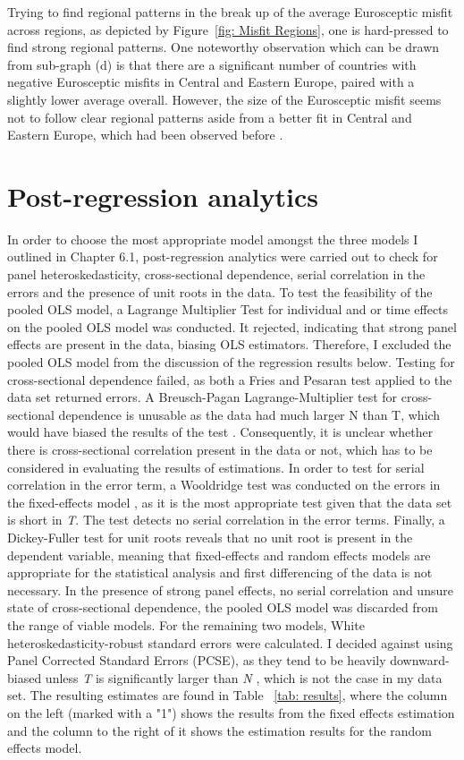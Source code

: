 Trying to find regional patterns in the break up of the average Eurosceptic misfit across regions, as depicted by Figure~\ref{fig: Misfit Regions}, one is hard-pressed to find strong regional patterns. One noteworthy observation which can be drawn from sub-graph (d) is that there are a significant number of countries with negative Eurosceptic misfits in Central and Eastern Europe, paired with a slightly lower average overall. However, the size of the Eurosceptic misfit seems not to follow clear regional patterns aside from a better fit in Central and Eastern Europe, which had been observed before \cite{Taggart2002}.


\section{Post-regression analytics}
In order to choose the most appropriate model amongst the three models I outlined in Chapter 6.1, post-regression analytics were carried out to check for panel heteroskedasticity, cross-sectional dependence, serial correlation in the errors and the presence of unit roots in the data. 
To test the feasibility of the pooled OLS model, a Lagrange Multiplier Test for individual and or time effects on the pooled OLS model was conducted. It rejected, indicating that strong panel effects are present in the data, biasing OLS estimators. Therefore, I excluded the pooled OLS model from the discussion of the regression results below.
Testing for cross-sectional dependence failed, as both a Fries and Pesaran test applied to the data set returned errors. A Breusch-Pagan Lagrange-Multiplier test for cross-sectional dependence is unusable as the data had much larger N than T, which would have biased the results of the test \cite{Breusch1980}. Consequently, it is unclear whether there is cross-sectional correlation present in the data or not, which has to be considered in evaluating the results of estimations. 
In order to test for serial correlation in the error term, a Wooldridge test was conducted on the errors in the fixed-effects model \cite{Wooldridge2002}, as it is the most appropriate test given that the data set is short in \emph{T}. The test detects no serial correlation in the error terms.  
Finally, a Dickey-Fuller test for unit roots reveals that no unit root is present in the dependent variable, meaning that fixed-effects and random effects models are appropriate for the statistical analysis and first differencing of the data is not necessary. 
In the presence of strong panel effects, no serial correlation and unsure state of cross-sectional dependence, the pooled OLS model was discarded from the range of viable models. For the remaining two models, White heteroskedasticity-robust standard errors were calculated. I decided against using Panel Corrected Standard Errors (PCSE), as they tend to be heavily downward-biased unless \emph{T} is significantly larger than \emph{N} \cite{Beck1995}, which is not the case in my data set. The resulting estimates are found in Table ~\ref{tab: results}, where the column on the left (marked with a "1") shows the results from the fixed effects estimation and the column to the right of it shows the estimation results for the random effects model. 


